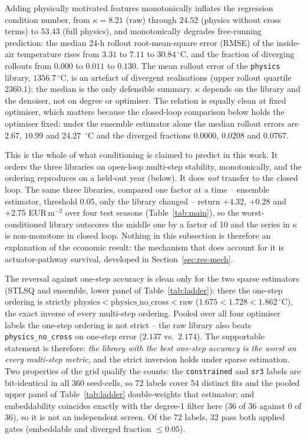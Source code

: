 Adding physically motivated features monotonically inflates the regression condition
number, from $\kappa=8.21$ (raw) through $24.52$ (physics without cross terms) to $53.43$
(full physics), and monotonically degrades free-running prediction: the median 24-h
rollout root-mean-square error (RMSE) of the inside-air temperature rises from $3.31$ to $7.11$ to $30.84\,^\circ$C,
and the fraction of diverging rollouts from $0.000$ to $0.011$ to $0.130$. The mean
rollout error of the \texttt{physics} library, $1356.7\,^\circ$C, is an artefact of
divergent realisations (upper rollout quartile $2360.1$); the median is the only defensible
summary. $\kappa$ depends on the library and the denoiser, not on degree or optimiser. The
relation is equally clean at fixed optimiser, which matters because the closed-loop
comparison below holds the optimiser fixed: under the ensemble estimator alone the median
rollout errors are $2.67$, $10.99$ and $24.27$~$^\circ$C and the diverged fractions
$0.0000$, $0.0208$ and $0.0767$.

This is the whole of what conditioning is claimed to predict in this work. It orders the
three libraries on open-loop multi-step stability, monotonically, and the ordering
reproduces on a held-out year (below). It does \emph{not} transfer to the closed loop. The
same three libraries, compared one factor at a time -- ensemble estimator, threshold
$0.05$, only the library changed -- return $+4.32$, $+0.28$ and $+2.75$ EUR\,m$^{-2}$ over
four test seasons (Table~\ref{tab:main}), so the worst-conditioned library outscores the
middle one by a factor of 10 and the series in $\kappa$ is non-monotone in closed loop.
Nothing in this subsection is therefore an explanation of the economic result: the
mechanism that does account for it is actuator-pathway survival, developed in
Section~\ref{sec:res-mech}.

The reversal against one-step accuracy is clean only for the two sparse estimators
(STLSQ and ensemble, lower panel of Table~\ref{tab:ladder}): there the one-step ordering
is strictly $\text{physics} < \text{physics\_no\_cross} < \text{raw}$
($1.675 < 1.728 < 1.862\,^\circ$C), the exact inverse of every multi-step ordering.
Pooled over all four optimiser labels the one-step ordering is not strict -- the raw
library also beats \texttt{physics\_no\_cross} on one-step error ($2.137$ vs.\ $2.174$).
The supportable statement is therefore: \emph{the library with the best one-step accuracy
is the worst on every multi-step metric}, and the strict inversion holds under sparse
estimation. Two properties of the grid qualify the counts: the \texttt{constrained} and
\texttt{sr3} labels are bit-identical in all 360 seed-cells, so 72 labels cover 54 distinct
fits and the pooled upper panel of Table~\ref{tab:ladder} double-weights that estimator;
and embeddability coincides exactly with the degree-1 filter here (36 of 36 against
0 of 36), so it is not an independent screen. Of the 72 labels, 32 pass both
applied gates (embeddable and diverged fraction $\le 0.05$).


